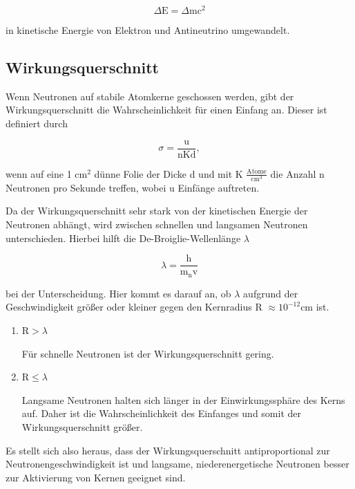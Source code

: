\begin{equation*}
\Delta\text{E} = \Delta\text{mc}^2
\end{equation*}

\noindent
in kinetische Energie von Elektron und Antineutrino umgewandelt.

\subsection{Wirkungsquerschnitt}
Wenn Neutronen auf stabile Atomkerne geschossen werden, gibt der Wirkungsquerschnitt die Wahrscheinlichkeit für einen Einfang an.
Dieser ist definiert durch

\begin{equation}
\sigma = \frac{\text{u}}{\text{nKd}},
\end{equation}

\noindent
wenn auf eine 1 $\si{\centi\meter\squared}$ dünne Folie der Dicke d und 
mit K $\frac{\text{Atome}}{\si{\centi\cubic\meter}}$ die Anzahl n Neutronen pro Sekunde treffen,
wobei u Einfänge auftreten.

\noindent
Da der Wirkungsquerschnitt sehr stark von der kinetischen Energie der Neutronen abhängt, 
wird zwischen schnellen und langsamen Neutronen unterschieden.
Hierbei hilft die De-Broiglie-Wellenlänge $\lambda$ 

\begin{equation}
\lambda = \frac{\text{h}}{\text{m}_\text{n} \text{v}}
\end{equation}

\noindent
bei der Unterscheidung.
Hier kommt es darauf an, 
ob $\lambda$ aufgrund der Geschwindigkeit größer oder kleiner gegen den Kernradius R $\approx 10^{-12} \si{\centi\meter}$ ist.

\begin{enumerate}

\item $\text{R}>\lambda$

Für schnelle Neutronen ist der Wirkungsquerschnitt gering.

\item $\text{R} \leq \lambda$

Langsame Neutronen halten sich länger in der Einwirkungssphäre des Kerns auf.
Daher ist die Wahrscheinlichkeit des Einfanges und somit der Wirkungsquerschnitt größer.

\end{enumerate}

\noindent
Es stellt sich also heraus, dass der Wirkungsquerschnitt antiproportional zur Neutronengeschwindigkeit ist und langsame, 
niederenergetische Neutronen besser zur Aktivierung von Kernen geeignet sind.


